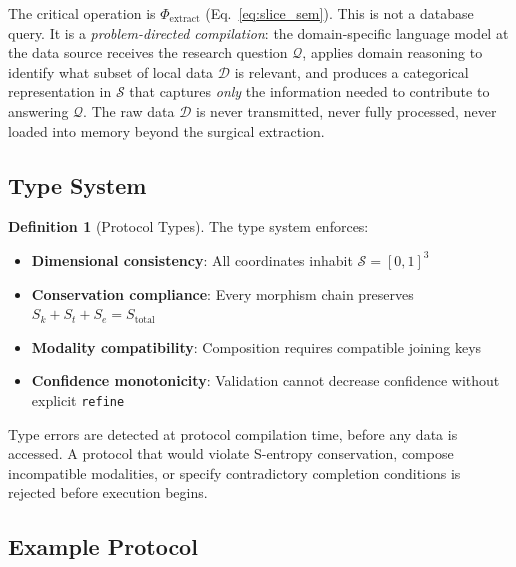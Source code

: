 \documentclass[10pt,twocolumn]{article}
\theoremstyle{definition}
\newtheorem{definition}[theorem]{Definition}
\theoremstyle{remark}
\newcommand{\Sk}{S_k}
\newcommand{\St}{S_t}
\newcommand{\Se}{S_e}
\newcommand{\Sspace}{\mathcal{S}}
\newcommand{\morphism}{\Phi}
\newcommand{\question}{\mathcal{Q}}
\newcommand{\dataset}{\mathcal{D}}
\newcommand{\Sk}{\mathscr{S}_k}
\newcommand{\Se}{\mathscr{S}_e}
\begin{document}
The critical operation is $\morphism_{\text{extract}}$ (Eq.~\ref{eq:slice_sem}). This is not a database query. It is a \emph{problem-directed compilation}: the domain-specific language model at the data source receives the research question $\question$, applies domain reasoning to identify what subset of local data $\dataset$ is relevant, and produces a categorical representation in $\Sspace$ that captures \emph{only} the information needed to contribute to answering $\question$. The raw data $\dataset$ is never transmitted, never fully processed, never loaded into memory beyond the surgical extraction.

\subsection{Type System}

\begin{definition}[Protocol Types]
The type system enforces:
\begin{itemize}[nosep]
\item \textbf{Dimensional consistency}: All coordinates inhabit $\Sspace = [0,1]^3$
\item \textbf{Conservation compliance}: Every morphism chain preserves $\Sk + \St + \Se = S_{\text{total}}$
\item \textbf{Modality compatibility}: Composition requires compatible joining keys
\item \textbf{Confidence monotonicity}: Validation cannot decrease confidence without explicit \texttt{refine}
\end{itemize}
\end{definition}

Type errors are detected at protocol compilation time, before any data is accessed. A protocol that would violate S-entropy conservation, compose incompatible modalities, or specify contradictory completion conditions is rejected before execution begins.

\subsection{Example Protocol}
\end{document}
